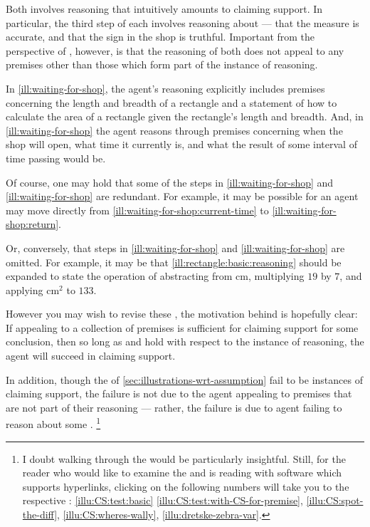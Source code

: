 \begin{note}
  Both  involves reasoning that intuitively amounts to claiming support.
  In particular, the third step of each  involves reasoning about  --- that the measure is accurate, and that the sign in the shop is truthful.
  Important from the perspective of \USE{}, however, is that the reasoning of both  does not appeal to any premises other than those which form part of the instance of reasoning.

  In \autoref{ill:waiting-for-shop}, the agent's reasoning explicitly includes premises concerning the length and breadth of a rectangle and a statement of how to calculate the area of a rectangle given the rectangle's length and breadth.
  And, in \autoref{ill:waiting-for-shop} the agent reasons through premises concerning when the shop will open, what time it currently is, and what the result of some interval of time passing would be.

  Of course, one may hold that some of the steps in \autoref{ill:waiting-for-shop} and \autoref{ill:waiting-for-shop} are redundant.
  For example, it may be possible for an agent may move directly from \ref{ill:waiting-for-shop:current-time} to \ref{ill:waiting-for-shop:return}.

  Or, conversely, that steps in \autoref{ill:waiting-for-shop} and \autoref{ill:waiting-for-shop} are omitted.
  For example, it may be that \ref{ill:rectangle:basic:reasoning} should be expanded to state the operation of abstracting from \(\text{cm}\), multiplying \(19\) by \(7\), and applying \(\text{cm}^{2}\) to \(133\).

  However you may wish to revise these , the motivation behind \USE{} is hopefully clear:
  If appealing to a collection of premises is sufficient for claiming support for some conclusion, then so long as \ideaCSA{} and \ideaCSB{} hold with respect to the instance of reasoning, the agent will succeed in claiming support.
\end{note}

\begin{note}
  In addition, though the  of \autoref{sec:illustrations-wrt-assumption} fail to be instances of claiming support, the failure is not due to the agent appealing to premises that are not part of their reasoning --- rather, the failure is due to agent failing to reason about some \requ{}.\nolinebreak
  \footnote{
    \label{fn:use:failure-hyperlinks}
    I doubt walking through the  would be particularly insightful.
    Still, for the reader who would like to examine the  and is reading with software which supports hyperlinks, clicking on the following numbers will take you to the respective : \ref{illu:CS:test:basic} %
    \ref{illu:CS:test:with-CS-for-premise}, %
    \ref{illu:CS:spot-the-diff}, %
    \ref{illu:CS:wheres-wally}, %
    \ref{illu:dretske-zebra-var}. %
  }
\end{note}


